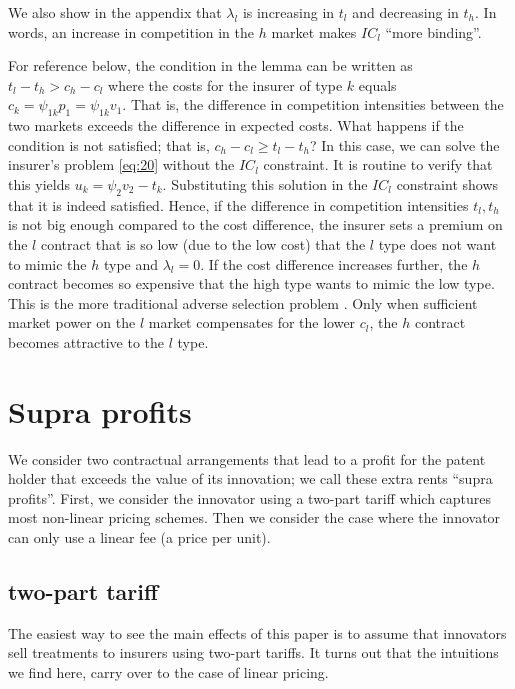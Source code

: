 \documentclass[a4paper,12pt]{article}
\begin{document}
We also show in the appendix that \(\lambda_l\) is increasing in \(t_l\) and decreasing in \(t_h\). In words, an increase in competition in the \(h\) market makes \(IC_l\) ``more binding''.

For reference below, the condition in the lemma can be written as \(t_l-t_h>c_h-c_l\) where the costs for the insurer of type \(k\) equals \(c_k = \psi_{1k} p_1= \psi_{1k}v_1\). That is, the difference in competition intensities between the two markets exceeds the difference in expected costs. What happens if the condition is not satisfied; that is, \(c_h -c_l \geq t_l-t_h\)? In this case, we can solve the insurer's problem \eqref{eq:20} without the \(IC_l\) constraint. It is routine to verify that this yields \(u_k = \psi_2 v_2-t_k\). Substituting this solution in the \(IC_l\) constraint shows that it is indeed satisfied. Hence, if the difference in competition intensities \(t_l,t_h\) is not big enough compared to the cost difference, the insurer sets a premium on the \(l\) contract that is so low (due to the low cost) that the \(l\) type does not want to mimic the \(h\) type and \(\lambda_l=0\). If the cost difference increases further, the \(h\) contract becomes so expensive that the high type wants to mimic the low type. This is the more traditional adverse selection problem \citep{rot76}. Only when sufficient market power on the \(l\) market compensates for the lower \(c_l\), the \(h\) contract becomes attractive to the \(l\) type.


\section{Supra profits}
\label{sec:org9903abe}

We consider two contractual arrangements that lead to a profit for the patent holder that exceeds the value of its innovation; we call these extra rents ``supra profits''. First, we consider the innovator using a two-part tariff which captures most non-linear pricing schemes. Then we consider the case where the innovator can only use a linear fee (a price per unit).

\subsection{two-part tariff}
\label{sec:org73d2747}

The easiest way to see the main effects of this paper is to assume that innovators sell treatments to insurers using two-part tariffs. It turns out that the intuitions we find here, carry over to the case of linear pricing.
\end{document}
